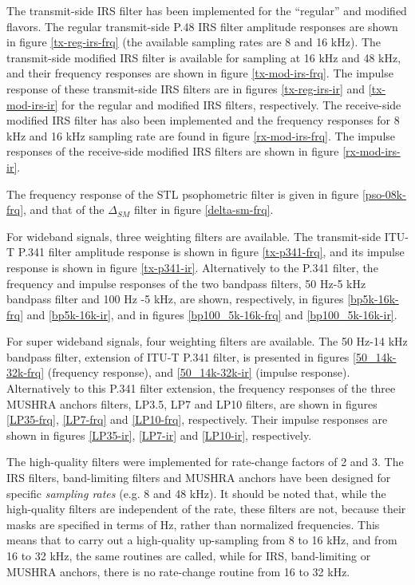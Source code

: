 The transmit-side IRS filter has been implemented for the ``regular''
and modified flavors. The regular transmit-side P.48 IRS filter
amplitude responses are shown in figure \ref{tx-reg-irs-frq} (the
available sampling rates are 8 and 16 kHz). The transmit-side modified
IRS filter is available for sampling at 16 kHz and 48 kHz, and
their frequency responses are shown in figure \ref{tx-mod-irs-frq}.
The impulse response of these transmit-side IRS filters are in figures
\ref{tx-reg-irs-ir} and \ref{tx-mod-irs-ir} for the regular and
modified IRS filters, respectively. The receive-side modified IRS
filter has also been implemented and the frequency responses for 8 kHz
and 16 kHz sampling rate are found in figure \ref{rx-mod-irs-frq}. The
impulse responses of the receive-side modified IRS filters are shown in
figure \ref{rx-mod-irs-ir}.

The frequency response of the STL psophometric filter is given in
figure \ref{pso-08k-frq}, and that of the $\Delta_{SM}$ filter in figure
\ref{delta-sm-frq}.

For wideband signals, three weighting filters are available. The
transmit-side ITU-T P.341 filter amplitude response is shown in
figure \ref{tx-p341-frq}, and its impulse response is shown in
figure \ref{tx-p341-ir}. Alternatively to the P.341 filter, the
frequency and impulse responses of the two bandpass filters,
50 Hz-5 kHz bandpass filter and 100 Hz -5 kHz, are shown, respectively,
in figures \ref{bp5k-16k-frq} and \ref{bp5k-16k-ir}, and in figures
\ref{bp100_5k-16k-frq} and \ref{bp100_5k-16k-ir}.

For super wideband signals, four weighting filters are available.
The 50 Hz-14 kHz bandpass filter, extension of ITU-T P.341 filter, is
presented in figures \ref{50_14k-32k-frq} (frequency response), and
\ref{50_14k-32k-ir} (impulse response). Alternatively to this P.341
filter extension, the frequency responses of the three MUSHRA
anchors filters, LP3.5, LP7 and LP10 filters, are shown in figures
\ref{LP35-frq}, \ref{LP7-frq} and \ref{LP10-frq}, respectively.
Their impulse responses are shown in figures \ref{LP35-ir},
\ref{LP7-ir} and \ref{LP10-ir}, respectively.

The high-quality filters were implemented for rate-change factors
of 2 and 3. The IRS filters, band-limiting filters and MUSHRA
anchors have been designed for specific {\em sampling rates} (e.g.
8 and 48 kHz). It should be noted that, while the high-quality
filters are independent of the rate, these filters are not,
because their masks are specified in terms of Hz, rather than
normalized frequencies. This means that to carry out a
high-quality up-sampling from 8 to 16 kHz, and from 16 to 32 kHz,
the same routines are called, while for IRS, band-limiting or
MUSHRA anchors, there is no rate-change routine from 16 to 32 kHz.

